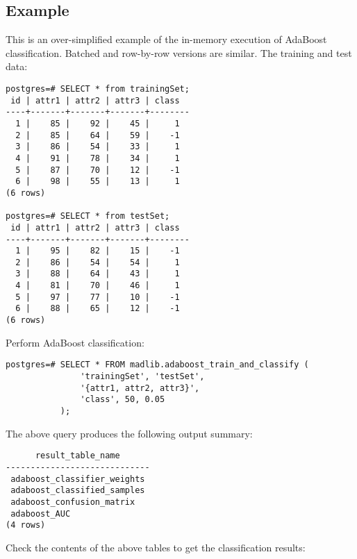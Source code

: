 \subsection*{Example}
This is an over-simplified example of the in-memory execution of AdaBoost classification. Batched and row-by-row versions are similar.
\vspace{\baselineskip}
{\raggedleft The training and test data:}

\begin{verbatim}
postgres=# SELECT * from trainingSet;
 id | attr1 | attr2 | attr3 | class 
----+-------+-------+-------+--------
  1 |    85 |    92 |    45 |     1 
  2 |    85 |    64 |    59 |    -1 
  3 |    86 |    54 |    33 |     1 
  4 |    91 |    78 |    34 |     1 
  5 |    87 |    70 |    12 |    -1 
  6 |    98 |    55 |    13 |     1 
(6 rows)

postgres=# SELECT * from testSet;
 id | attr1 | attr2 | attr3 | class 
----+-------+-------+-------+--------
  1 |    95 |    82 |    15 |    -1 
  2 |    86 |    54 |    54 |     1 
  3 |    88 |    64 |    43 |     1 
  4 |    81 |    70 |    46 |     1 
  5 |    97 |    77 |    10 |    -1 
  6 |    88 |    65 |    12 |    -1 
(6 rows)
\end{verbatim}

{\raggedleft Perform AdaBoost classification:}

\begin{verbatim}
postgres=# SELECT * FROM madlib.adaboost_train_and_classify (
               'trainingSet', 'testSet', 
               '{attr1, attr2, attr3}', 
               'class', 50, 0.05
           );
\end{verbatim}

{\raggedleft The above query produces the following output summary:}

\begin{verbatim}
      result_table_name      
-----------------------------
 adaboost_classifier_weights
 adaboost_classified_samples
 adaboost_confusion_matrix
 adaboost_AUC
(4 rows)
\end{verbatim}

{\raggedleft Check the contents of the above tables to get the classification results:}


